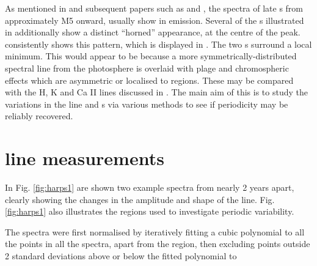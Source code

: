 As mentioned in \citet{mohanty03} and subsequent papers such as \citet{jenkins09} and \citet{barnes14}, the spectra of
late \rdwarf s from approximately M5 onward, usually show {\ha} in emission. Several of the \rdwarf s illustrated in
\citet[Fig. 6]{barnes14} additionally show a distinct ``horned'' appearance,  at
the centre of the {\ha} peak.  {\prox} consistently shows this pattern, which is displayed in
\citet[Fig. 14]{fuhrmeister11}. The two \horn s surround a local minimum.  This would appear to be because a more
symmetrically-distributed spectral line from the photosphere is overlaid with plage and chromospheric effects which are
asymmetric or localised to regions. These may be compared with the H, K and Ca II lines discussed in
\citet{rauscher06}. The main aim of this {\paperorthesis} is to study the variations in the line and \horn s via various
methods to see if periodicity may be reliably recovered.

\section{{\ha} line measurements}
\protect\label{section:linemeas}

In Fig. \ref{fig:harps1} are shown two example spectra from {\harps} nearly 2 years apart, clearly showing the changes
in the amplitude and shape of the {\ha} line. Fig. \ref{fig:harps1} also illustrates the regions used to
investigate periodic variability.

The spectra were first normalised by iteratively fitting a cubic polynomial to all the points in all the spectra, apart
from the {\ha} region, then excluding points outside 2 standard deviations above or below the fitted polynomial to

